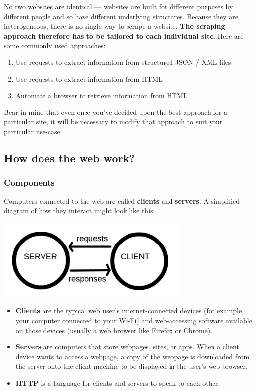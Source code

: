 \documentclass[
]{book}
\providecommand{\tightlist}{%
  \setlength{\itemsep}{0pt}\setlength{\parskip}{0pt}}
\begin{document}
No two websites are identical --- websites are built for different purposes by different people and so have different underlying structures. Because they are heterogeneous, there is no single way to scrape a website. \textbf{The scraping approach therefore has to be tailored to each individual site.} Here are some commonly used approaches:

\begin{enumerate}
\def\labelenumi{\arabic{enumi}.}
\tightlist
\item
  Use requests to extract information from structured JSON / XML files
\item
  Use requests to extract information from HTML
\item
  Automate a browser to retrieve information from HTML
\end{enumerate}

Bear in mind that even once you've decided upon the best approach for a particular site, it will be necessary to modify that approach to suit your particular use-case.

\hypertarget{how-does-the-web-work}{%
\subsection{How does the web work?}\label{how-does-the-web-work}}

\hypertarget{components}{%
\subsubsection{Components}\label{components}}

Computers connected to the web are called \textbf{clients} and \textbf{servers}. A simplified diagram of how they interact might look like this:

\includegraphics{Python/PythonWebScrape/images/client_server.png}

\begin{itemize}
\tightlist
\item
  \textbf{Clients} are the typical web user's internet-connected devices (for example, your computer connected to your Wi-Fi) and web-accessing software available on those devices (usually a web browser like Firefox or Chrome).
\item
  \textbf{Servers} are computers that store webpages, sites, or apps. When a client device wants to access a webpage, a copy of the webpage is downloaded from the server onto the client machine to be displayed in the user's web browser.
\item
  \textbf{HTTP} is a language for clients and servers to speak to each other.
\end{itemize}
\end{document}

